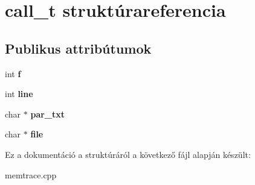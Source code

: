 \hypertarget{structcall__t}{}\section{call\+\_\+t struktúrareferencia}
\label{structcall__t}
\subsection*{Publikus attribútumok}
\begin{DoxyCompactItemize}
\item 
\mbox{\label{structcall__t_a59d4e803f2e254dc5ceeb9c1bfcc9355}} 
int {\bfseries f}
\item 
\mbox{\label{structcall__t_aaa4f0e556289bbf4da414897b10e0916}} 
int {\bfseries line}
\item 
\mbox{\label{structcall__t_a24e185188a17e272396e118640672aba}} 
char $\ast$ {\bfseries par\+\_\+txt}
\item 
\mbox{\label{structcall__t_a97629ec51d024396221fe7d48c84859a}} 
char $\ast$ {\bfseries file}
\end{DoxyCompactItemize}


Ez a dokumentáció a struktúráról a következő fájl alapján készült\+:\begin{DoxyCompactItemize}
\item 
memtrace.\+cpp\end{DoxyCompactItemize}
